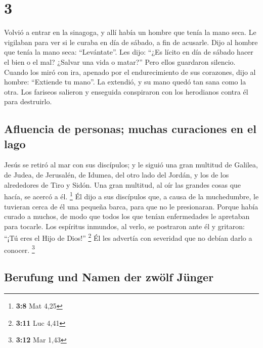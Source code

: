 \hypertarget{section-2}{%
\section{3}\label{section-2}}

 Volvió a entrar en la sinagoga, y allí había un hombre
que tenía la mano seca.  Le vigilaban para ver si le
curaba en día de sábado, a fin de acusarle.  Dijo al
hombre que tenía la mano seca: ``Levántate''.  Les dijo:
``¿Es lícito en día de sábado hacer el bien o el mal? ¿Salvar una vida o
matar?'' Pero ellos guardaron silencio.  Cuando los miró
con ira, apenado por el endurecimiento de sus corazones, dijo al hombre:
``Extiende tu mano''. La extendió, y su mano quedó tan sana como la
otra.  Los fariseos salieron y enseguida conspiraron con
los herodianos contra él para destruirlo.

\hypertarget{afluencia-de-personas-muchas-curaciones-en-el-lago}{%
\subsection{Afluencia de personas; muchas curaciones en el
lago}\label{afluencia-de-personas-muchas-curaciones-en-el-lago}}

 Jesús se retiró al mar con sus discípulos; y le siguió
una gran multitud de Galilea, de Judea,  de Jerusalén, de
Idumea, del otro lado del Jordán, y los de los alrededores de Tiro y
Sidón. Una gran multitud, al oír las grandes cosas que hacía, se acercó
a él. \footnote{\textbf{3:8} Mat 4,25}  Él dijo a sus
discípulos que, a causa de la muchedumbre, le tuvieran cerca de él una
pequeña barca, para que no le presionaran.  Porque había
curado a muchos, de modo que todos los que tenían enfermedades le
apretaban para tocarle.  Los espíritus inmundos, al
verlo, se postraron ante él y gritaron: ``¡Tú eres el Hijo de Dios!''
\footnote{\textbf{3:11} Luc 4,41}  Él les advertía con
severidad que no debían darlo a conocer. \footnote{\textbf{3:12} Mar
  1,43}

\hypertarget{berufung-und-namen-der-zwuxf6lf-juxfcnger}{%
\subsection{Berufung und Namen der zwölf
Jünger}\label{berufung-und-namen-der-zwuxf6lf-juxfcnger}}

